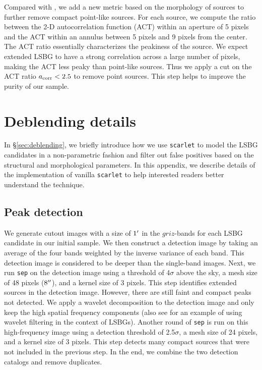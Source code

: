 \documentclass[twocolumn,astrosymb,twocolappendix]{aastex631}
\newcommand{\code}[1]{\texttt{#1}}
\begin{document}
\begin{CJK*}{UTF8}{gbsn}
Compared with , we add a new metric based on the morphology of sources to further remove compact point-like sources. For each source, we compute the ratio between the 2-D autocorrelation function (ACT) within an aperture of 5 pixels and the ACT within an annulus between 5 pixels and 9 pixels from the center. The ACT ratio essentially characterizes the peakiness of the source. We expect extended LSBG to have a strong correlation across a large number of pixels, making the ACT less peaky than point-like sources. Thus we apply a cut on the ACT ratio $a_{\rm corr} < 2.5$ to remove point sources. This step helps to improve the purity of our sample.


\section{Deblending details}\label{ap:deblending}
In \S\ref{sec:deblending}, we briefly introduce how we use \code{scarlet} to model the LSBG candidates in a non-parametric fashion and filter out false positives based on the structural and morphological parameters. In this appendix, we describe details of the implementation of vanilla \code{scarlet} to help interested readers better understand the technique.

\subsection{Peak detection}\label{sec:peak}
We generate cutout images with a size of $1\mbox{$^\prime$}$ in the $griz$-bands for each LSBG candidate in our initial sample. We then construct a detection image by taking an average of the four bands weighted by the inverse variance of each band. This detection image is considered to be deeper than the single-band images. 
Next, we run \code{sep} on the detection image using a threshold of 4$\sigma$ above the sky, a mesh size of 48 pixels ($8\mbox{$^{\prime\prime}$}$), and a kernel size of 3 pixels. This step identifies extended sources in the detection image. However, there are still faint and compact peaks not detected. We apply a wavelet decomposition to the detection image \citep{Starck2015} and only keep the high spatial frequency components (also see \citealt{Zaritsky2019} for an example of using wavelet filtering in the context of LSBGs). Another round of \code{sep} is run on this high-frequency image using a detection threshold of 2.5$\sigma$, a mesh size of 24 pixels, and a kernel size of 3 pixels. This step detects many compact sources that were not included in the previous step. In the end, we combine the two detection catalogs and remove duplicates. 


\end{CJK*}
\end{document}
